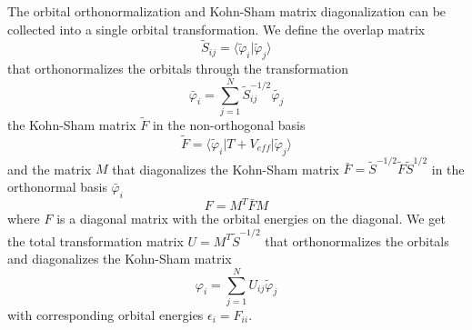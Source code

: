 The orbital orthonormalization and Kohn-Sham matrix diagonalization can be 
collected into a single orbital transformation. We define the overlap matrix
\begin{equation}
    \tilde{S}_{ij} = \langle \tilde{\varphi}_i | \tilde{\varphi}_j \rangle
\end{equation}
that orthonormalizes the orbitals through the transformation
\begin{equation}
    \bar{\varphi}_i = \sum_{j=1}^N \tilde{S}^{-1/2}_{ij}\tilde{\varphi_j}
\end{equation}
the Kohn-Sham matrix $\tilde{F}$ in the non-orthogonal basis
\begin{equation}
    \label{eq:KS-matrix}
    \tilde{F} = \langle\tilde{\varphi}_i | T + V_{eff} | \tilde{\varphi}_j\rangle
\end{equation}
and the matrix $M$ that diagonalizes the Kohn-Sham matrix $\bar{F} = \tilde{S}^{-1/2}\tilde{F}\tilde{S}^{1/2}$
in the orthonormal basis $\bar{\varphi}_i$
\begin{equation}
    F = M^T\bar{F}M
\end{equation}
where $F$ is a diagonal matrix with the orbital energies on the diagonal. We get the 
total transformation matrix $U = M^T\tilde{S}^{-1/2}$ that orthonormalizes the orbitals 
and diagonalizes the Kohn-Sham matrix
\begin{equation}
    \varphi_i = \sum_{j=1}^N U_{ij} \tilde{\varphi}_j
\end{equation}
with corresponding orbital energies $\epsilon_i = F_{ii}$.

